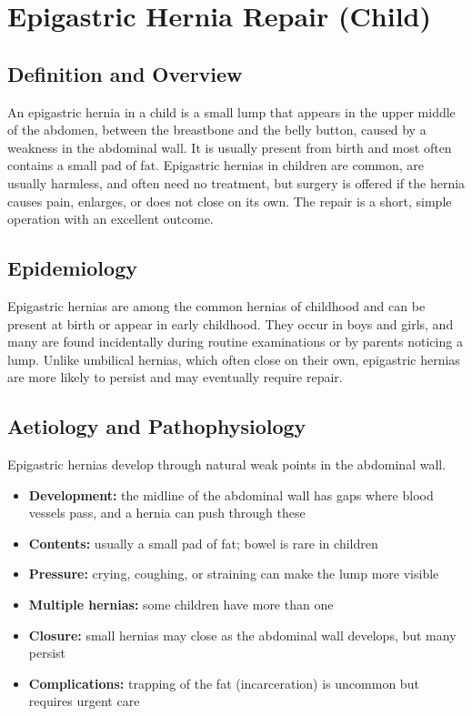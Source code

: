 \chapter{Epigastric Hernia Repair (Child)}

\section*{Definition and Overview}
An epigastric hernia in a child is a small lump that appears in the upper middle of the abdomen, between the breastbone and the belly button, caused by a weakness in the abdominal wall. It is usually present from birth and most often contains a small pad of fat. Epigastric hernias in children are common, are usually harmless, and often need no treatment, but surgery is offered if the hernia causes pain, enlarges, or does not close on its own. The repair is a short, simple operation with an excellent outcome.

\section*{Epidemiology}
Epigastric hernias are among the common hernias of childhood and can be present at birth or appear in early childhood. They occur in boys and girls, and many are found incidentally during routine examinations or by parents noticing a lump. Unlike umbilical hernias, which often close on their own, epigastric hernias are more likely to persist and may eventually require repair.

\section*{Aetiology and Pathophysiology}
Epigastric hernias develop through natural weak points in the abdominal wall.
\begin{itemize}
    \item \textbf{Development:} the midline of the abdominal wall has gaps where blood vessels pass, and a hernia can push through these
    \item \textbf{Contents:} usually a small pad of fat; bowel is rare in children
    \item \textbf{Pressure:} crying, coughing, or straining can make the lump more visible
    \item \textbf{Multiple hernias:} some children have more than one
    \item \textbf{Closure:} small hernias may close as the abdominal wall develops, but many persist
    \item \textbf{Complications:} trapping of the fat (incarceration) is uncommon but requires urgent care
\end{itemize}

